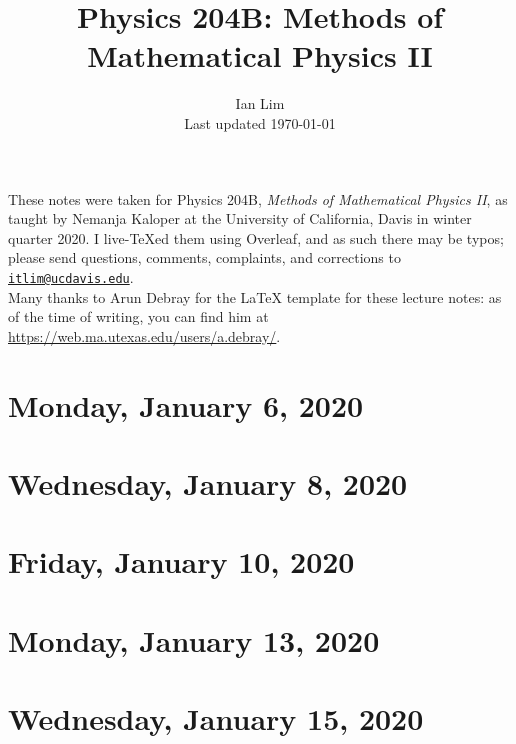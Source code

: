\documentclass{../mynotes}
\begin{document}
\title{Physics 204B: Methods of Mathematical Physics II}
\author{Ian Lim\\ Last updated \today}
\maketitle
{\small\noindent These notes were taken for Physics 204B, \emph{Methods of Mathematical Physics II}, as taught by Nemanja Kaloper at the University of California, Davis in winter quarter 2020. I live-\TeX ed them using Overleaf, and as such there may be typos; please send questions, comments, complaints, and corrections to 
\href{mailto:itlim@ucdavis.edu?subject=204B\%20Lecture\%20Notes}{\texttt{itlim@ucdavis.edu}}.\\
Many thanks to Arun Debray for the {\LaTeX} template for these lecture notes: as of the time of writing, you can find him at \url{https://web.ma.utexas.edu/users/a.debray/}.}

\tableofcontents

\section{Monday, January 6, 2020}
	
\section{Wednesday, January 8, 2020}
    
\section{Friday, January 10, 2020}
    

\section{Monday, January 13, 2020}
	
\section{Wednesday, January 15, 2020}
    
%     

%     
%     
\end{document}
